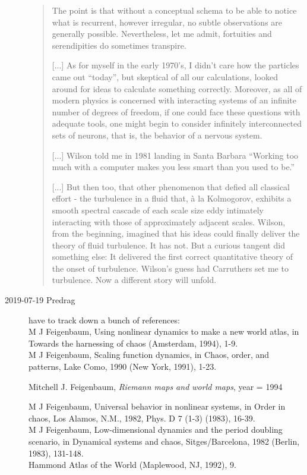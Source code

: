 \begin{description}
\begin{quote}
The point is that without a conceptual schema to be able to notice what
is recurrent, however irregular, no subtle observations are generally
possible. Nevertheless, let me admit, fortuities and serendipities do
sometimes transpire.

[...]
As for myself in the early 1970's, I didn't care how the particles came
out ``today'', but skeptical of all our calculations, looked around for
ideas to calculate something correctly. Moreover, as all of modern
physics is concerned with interacting systems of an infinite number of
degrees of freedom, if one could face these questions with adequate
tools, one might begin to consider infinitely interconnected sets of
neurons, that is, the behavior of a nervous system.

[...]
Wilson told me in 1981 landing in Santa Barbara ``Working too much with a
computer makes you less smart than you used to be.''

[...]
But then too, that other phenomenon that defied all classical effort -
the turbulence in a fluid that, à la Kolmogorov, exhibits a smooth
spectral cascade of each scale size eddy intimately interacting with
those of approximately adjacent scales. Wilson, from the beginning,
imagined that his ideas could finally deliver the theory of fluid
turbulence. It has not. But a curious tangent did something else: It
delivered the first correct quantitative theory of the onset of
turbulence. Wilson's guess had Carruthers set me to turbulence. Now a
different story will unfold.

\end{quote}

\item[2019-07-19 Predrag]
have to track down a bunch of references:\\
 M J Feigenbaum, Using nonlinear dynamics to make a new world atlas, in Towards the harnessing of chaos (Amsterdam, 1994), 1-9.
\\
M J Feigenbaum, Scaling function dynamics, in Chaos, order, and patterns, Lake Como, 1990 (New York, 1991), 1-23.

{Mitchell J. Feigenbaum},
{\em Riemann maps and world maps},
  year      = {1994}

M J Feigenbaum, Universal behavior in nonlinear systems, in Order in chaos, Los Alamos, N.M., 1982, Phys. D 7 (1-3) (1983), 16-39.
\\
M J Feigenbaum, Low-dimensional dynamics and the period doubling scenario, in Dynamical systems and chaos, Sitges/Barcelona, 1982 (Berlin, 1983), 131-148.
\\
Hammond Atlas of the World (Maplewood, NJ, 1992), 9.

\end{description}


